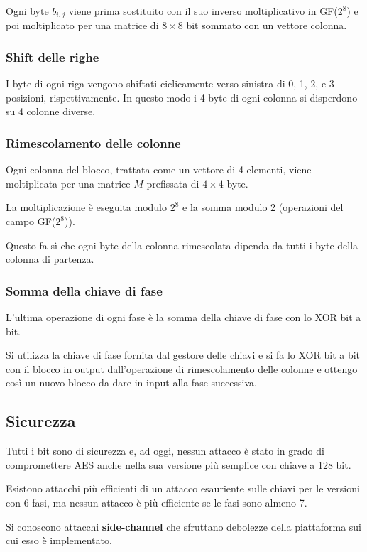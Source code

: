 Ogni byte $b_{i, j}$ viene prima sostituito con il suo inverso moltiplicativo in GF($2^8$) e poi moltiplicato per una
matrice di $8 \times 8$ bit sommato con un vettore colonna.

\subsubsection{Shift delle righe}
I byte di ogni riga vengono shiftati ciclicamente verso sinistra di 0, 1, 2, e 3 posizioni, rispettivamente. In questo
modo i 4 byte di ogni colonna si disperdono su 4 colonne diverse.

\subsubsection{Rimescolamento delle colonne}
Ogni colonna del blocco, trattata come un vettore di 4 elementi, viene moltiplicata per una matrice $M$ prefissata di
$4 \times 4$ byte.

La moltiplicazione \`e eseguita modulo $2^8$ e la somma modulo 2 (operazioni del campo GF($2^8$)).

Questo fa s\`i che ogni byte della colonna rimescolata dipenda da tutti i byte della colonna di partenza.

\subsubsection{Somma della chiave di fase}
L'ultima operazione di ogni fase \`e la somma della chiave di fase con lo XOR bit a bit.

Si utilizza la chiave di fase fornita dal gestore delle chiavi e si fa lo XOR bit a bit con il blocco in output
dall'operazione di rimescolamento delle colonne e ottengo cos\`i un nuovo blocco da dare in input alla fase successiva.

\subsection{Sicurezza}
Tutti i bit sono di sicurezza e, ad oggi, nessun attacco \`e stato in grado di compromettere AES anche nella sua
versione pi\`u semplice con chiave a 128 bit.

Esistono attacchi pi\`u efficienti di un attacco esauriente sulle chiavi per le versioni con 6 fasi, ma nessun attacco
\`e pi\`u efficiente se le fasi sono almeno 7.

Si conoscono attacchi \textbf{side-channel} che sfruttano debolezze della piattaforma sui cui esso \`e implementato.

